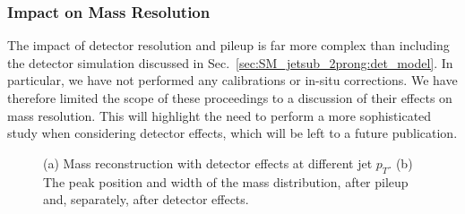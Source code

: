 \subsubsection{Impact on Mass Resolution}\label{sec:SM_jetsub_2prong:detector_robust}

The impact of detector resolution and pileup is far more complex than
including the detector simulation discussed in
Sec.~\ref{sec:SM_jetsub_2prong:det_model}.
%
In particular, we have not performed any calibrations or in-situ
corrections.
%
We have therefore limited the scope of these proceedings to a
discussion of their effects on mass resolution.
%
This will highlight the need to perform a more sophisticated study
when considering detector effects, which will be left to a future
publication.

\begin{figure}
  \caption{(a) Mass reconstruction with detector effects at different jet $p_T$.  (b) The peak position and width of the mass distribution, after pileup and, separately, after detector effects.}\label{fig:SM_jetsub_2prong:mass-detector}
\end{figure}

